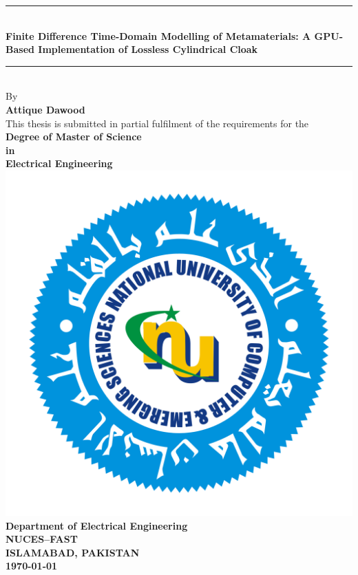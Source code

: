 
\begin{titlepage}
\begin{center}

\rule{\linewidth}{0.5mm}\\[0.3cm]
{\Large \bfseries Finite Difference Time-Domain Modelling of Metamaterials: A GPU-Based Implementation of Lossless Cylindrical Cloak}\\
\rule{\linewidth}{0.5mm}\\[0.5cm]

{\large By}\\[0.5cm]
{\large \bfseries Attique Dawood}\\[1cm]

{\large This thesis is submitted in partial fulfilment of the requirements for the}\\[1cm]
{\large \bfseries Degree of Master of Science\\[0.2cm] in\\[0.2cm] Electrical Engineering}\\[2cm]

\includegraphics[scale=0.15]{NU_Logo.png}\\[2cm]

{\large \bfseries Department of Electrical Engineering}\\[0.2cm]
{\large \bfseries NUCES--FAST}\\[0.2cm]
{\large \bfseries ISLAMABAD, PAKISTAN}\\[0.2cm]
{\large \bfseries \today}

\end{center}
\end{titlepage}